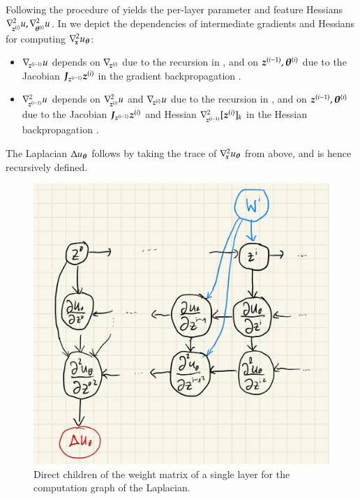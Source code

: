 Following the procedure of  yields the
per-layer parameter and feature Hessians $\nabla_{\!{{\boldsymbol{z}}^{(i)}}}^{2}u,
\nabla_{\!{{\boldsymbol{\theta}}^{(i)}}}^{2}u$. In  we depict the dependencies of
intermediate gradients and Hessians for computing $\nabla_{\!{{\boldsymbol{x}}}}^{2}u_{{\boldsymbol{\theta}}}$:
\begin{itemize}
\item $\nabla_{\!{{\boldsymbol{z}}^{(i-1)}}}u$ depends on $\nabla_{\!{{\boldsymbol{z}}^{(i)}}}$ due to the recursion in , and on ${\boldsymbol{z}}^{(i-1)}, {\boldsymbol{\theta}}^{(i)}$ due to the Jacobian ${\boldsymbol{J}}_{{\boldsymbol{z}}^{(i-1)}}{\boldsymbol{z}}^{(i)}$ in the gradient backpropagation .

\item $\nabla_{\!{{\boldsymbol{z}}^{(i-1)}}}^{2}u$ depends on $\nabla_{\!{{\boldsymbol{z}}^{(i)}}}^{2}u$ and $\nabla_{\!{{\boldsymbol{z}}^{(i)}}} u$ due to the recursion in , and on ${\boldsymbol{z}}^{(i-1)}, {\boldsymbol{\theta}}^{(i)}$ due to the Jacobian ${\boldsymbol{J}}_{{\boldsymbol{z}}^{(i-1)}}{\boldsymbol{z}}^{(i)}$ and Hessian $\nabla_{\!{{\boldsymbol{z}}^{(i-1)}}}^{2}[{\boldsymbol{z}}^{(i)}]_k$ in the Hessian backpropagation .
\end{itemize}


The Laplacian $\Delta u_{{\boldsymbol{\theta}}}$ follows by taking the trace of
$\nabla_{\!{{\boldsymbol{x}}}}^{2}u_{{\boldsymbol{\theta}}}$ from above, and is hence recursively defined.

\begin{figure}[t]
  \centering
  \includegraphics[width=0.6\linewidth]{figures/HBP_graph_weight.png}
  \caption{Direct children of the weight matrix of a single layer for the computation graph of the Laplacian.}\label{fig:laplacian-graph-weight}
\end{figure}

